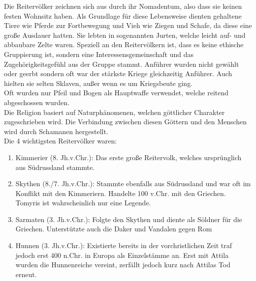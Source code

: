 \documentclass{article}
\begin{document}
	Die Reitervölker zeichnen sich aus durch ihr Nomadentum, also dass sie keinen festen Wohnsitz haben. Als Grundlage für diese Lebensweise dienten gehaltene Tiere wie Pferde zur Fortbewegung und Vieh wie Ziegen und Schafe, da diese eine große Ausdauer hatten. Sie lebten in sogenannten Jurten, welche leicht auf- und abbaubare Zelte waren. Speziell an den Reitervölkern ist, dass es keine ethische Gruppierung ist, sondern eine Interessensgemeinschaft und das Zugehörigkeitsgefühl aus der Gruppe stammt. Anführer wurden nicht gewählt oder geerbt sondern oft war der stärkste Kriege gleichzeitig Anführer. Auch hielten sie selten Sklaven, außer wenn es um Kriegsbeute ging. \\
	Oft wurden nur Pfeil und Bogen als Hauptwaffe verwendet, welche reitend abgeschossen wurden. \\
	Die Religion basiert auf Naturphänomenen, welchen göttlicher Charakter zugeschrieben wird. Die Verbindung zwischen diesen Göttern und den Menschen wird durch Schamanen hergestellt. \\
	Die 4 wichtigsten Reitervölker waren:
	\begin{enumerate}
		\item{Kimmerier (8. Jh.v.Chr.): Das erste große Reitervolk, welches ursprünglich aus Südrussland stammte.}
		\item{Skythen (8./7. Jh.v.Chr.): Stammte ebenfalls aus Südrussland und war oft im Konflikt mit den Kimmeriern. Handelte 100 v.Chr. mit den Griechen. Tomyris ist wahrscheinlich nur eine Legende.}
		\item{Sarmaten (3. Jh.v.Chr.): Folgte den Skythen und diente als Söldner für die Griechen. Unterstützte auch die Daker und Vandalen gegen Rom}
		\item{Hunnen (3. Jh.v.Chr.): Existierte bereits in der vorchristlichen Zeit traf jedoch erst 400 n.Chr. in Europa als Einzelstämme an. Erst mit Attila wurden die Hunnenreiche vereint, zerfällt jedoch kurz nach Attilas Tod erneut.}
	\end{enumerate}
	
	
	


























	
\end{document}
